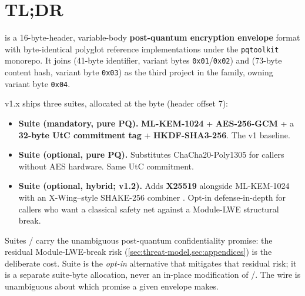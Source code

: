 \section*{TL;DR}

\pqcrypt{} is a 16-byte-header, variable-body \textbf{post-quantum encryption envelope} format with byte-identical polyglot reference implementations under the \texttt{pqtoolkit} monorepo. It joins \pqid{} (41-byte identifier, variant bytes \texttt{0x01}/\texttt{0x02}) and \pqhash{} (73-byte content hash, variant byte \texttt{0x03}) as the third project in the family, owning variant byte \texttt{0x04}.

v1.x ships three suites, allocated at the  byte (header offset 7):

\begin{itemize}
\item \textbf{Suite  (mandatory, pure PQ).} \textbf{ML-KEM-1024} \citep{fips203} + \textbf{AES-256-GCM} + a \textbf{32-byte UtC commitment tag} \citep{bellare2022commitment} + \textbf{HKDF-SHA3-256}. The v1 baseline.
\item \textbf{Suite  (optional, pure PQ).} Substitutes ChaCha20-Poly1305 for callers without AES hardware. Same UtC commitment.
\item \textbf{Suite  (optional, hybrid; v1.2).} Adds \textbf{X25519} \citep{rfc7748} alongside ML-KEM-1024 with an X-Wing--style SHAKE-256 combiner \citep{xwing-draft}. Opt-in defense-in-depth for callers who want a classical safety net against a Module-LWE structural break.
\end{itemize}

Suites / carry the unambiguous post-quantum confidentiality promise: the residual Module-LWE-break risk (\cref{sec:threat-model,sec:appendices}) is the deliberate cost. Suite  is the \emph{opt-in} alternative that mitigates that residual risk; it is a separate suite-byte allocation, never an in-place modification of /. The wire is unambiguous about which promise a given envelope makes.


